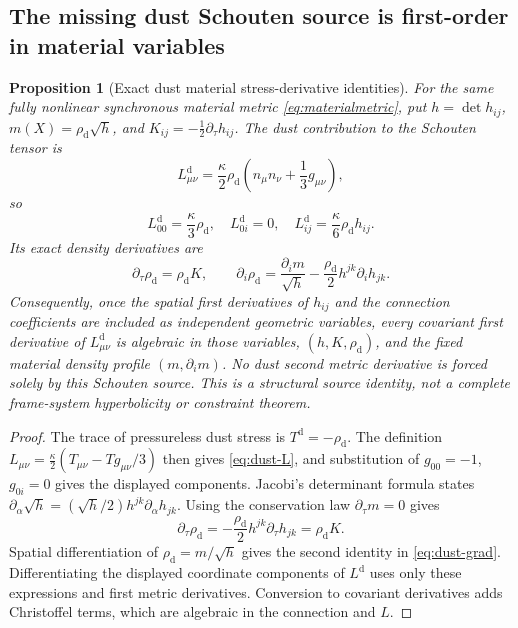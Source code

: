 \documentclass[11pt,a4paper]{article}
\newtheorem{proposition}{Proposition}
\begin{document}
\subsection{The missing dust Schouten source is first-order in material variables}
\begin{proposition}[Exact dust material
stress-derivative identities]
\label{prop:dust-schouten}
For the same fully nonlinear
synchronous material metric
\eqref{eq:materialmetric}, put
$h=\det h_{ij}$,
$m(X)=\rho_{\mathrm d}\sqrt h$,
and $K_{ij}=-\tfrac12\partial_\tau h_{ij}$.
The dust contribution to the
Schouten tensor is
\begin{equation}\label{eq:dust-L}
L^{\mathrm d}_{\mu\nu}
=\frac{\kappa}{2}\rho_{\mathrm d}
\left(n_\mu n_\nu
+\frac13 g_{\mu\nu}\right),
\end{equation}
so
\[
L^{\mathrm d}_{00}=\frac{\kappa}{3}\rho_{\mathrm d},
\quad L^{\mathrm d}_{0i}=0,
\quad L^{\mathrm d}_{ij}=\frac{\kappa}{6}
\rho_{\mathrm d}h_{ij}.
\]
Its exact density derivatives are
\begin{equation}\label{eq:dust-grad}
\boxed{\quad
\partial_\tau\rho_{\mathrm d}
=\rho_{\mathrm d}K,\qquad
\partial_i\rho_{\mathrm d}
=\frac{\partial_i m}{\sqrt h}
-\frac{\rho_{\mathrm d}}2
h^{jk}\partial_i h_{jk}.
\quad}
\end{equation}
Consequently, once the spatial
first derivatives of $h_{ij}$
and the connection coefficients
are included as independent
geometric variables, every
covariant \emph{first derivative}
of $L^{\mathrm d}_{\mu\nu}$
is algebraic in those variables,
$(h,K,\rho_{\mathrm d})$,
and the fixed material density
profile $(m,\partial_i m)$.
No dust \emph{second metric}
derivative is forced solely by
this Schouten source. This is
a structural source identity,
not a complete frame-system
hyperbolicity or constraint theorem.
\end{proposition}
\begin{proof}
The trace of pressureless dust
stress is $T^{\mathrm d}
=-\rho_{\mathrm d}$.
The definition
$L_{\mu\nu}=\frac{\kappa}{2}
(T_{\mu\nu}-Tg_{\mu\nu}/3)$
then gives \eqref{eq:dust-L},
and substitution of
$g_{00}=-1$, $g_{0i}=0$
gives the displayed components.
Jacobi's determinant formula
states
$\partial_\alpha\sqrt h
=(\sqrt h/2)h^{jk}
\partial_\alpha h_{jk}$.
Using the conservation law
$\partial_\tau m=0$ gives
\[
\partial_\tau\rho_{\mathrm d}
=-\frac{\rho_{\mathrm d}}2
h^{jk}\partial_\tau h_{jk}
=\rho_{\mathrm d}K.
\]
Spatial differentiation of
$\rho_{\mathrm d}=m/\sqrt h$
gives the second identity
in \eqref{eq:dust-grad}.
Differentiating the displayed
coordinate components of
$L^{\mathrm d}$ uses only
these expressions and first
metric derivatives.
Conversion to covariant
derivatives adds Christoffel
terms, which are algebraic
in the connection and $L$.
\end{proof}
\end{document}

